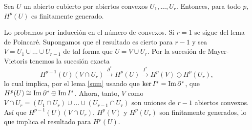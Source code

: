 \documentclass[CV.tex]{subfiles}
\begin{document}
\begin{teorema}
Sea $U$ un abierto cubierto por abiertos convexos $U_1,\dots, U_r$. Entonces, para todo $p$, $H^p(U)$ es finitamente generado.
\end{teorema}
\begin{dem}
Lo probamos por inducción en el número de convexos. Si $r=1$ se sigue del lema de Poincaré. Supongamos que el resultado es cierto para $r-1$ y sea $V=U_1\cup\dots\cup U_{r-1}$ de tal forma que $U=V\cup U_r$. Por la sucesión de Mayer-Vietoris tenemos la sucesión exacta
\[
H^{p-1}(U)(V\cap U_r)\overset{\partial^*}{\to} H^p(U)\overset{I^*}{\to} H^p(V)\oplus H^p(U_r),
\]
lo cual implica, por el lema \ref{sum} usando que $\ker{I^*}=\operatorname{Im}{\partial^*}$, que $H^p(U)\cong \operatorname{Im}{\partial^*}\oplus\operatorname{Im}{I^*}$. Ahora, tanto, $V$ como $V\cap U_r=(U_1\cap U_r)\cup\dots\cup (U_{r-1}\cap U_r)$ son uniones de $r-1$ abiertos convexos. Así que $H^{p-1}(U)(V\cap U_r)$, $H^p(V)$ y $H^p(U_r)$ son finitamente generados, lo que implica el resultado para $H^p(U)$. \QED
\end{dem}
\end{document}
